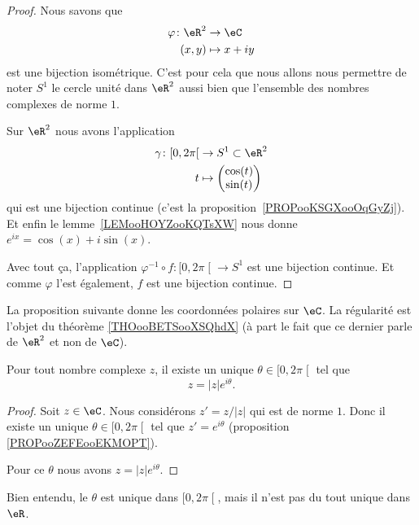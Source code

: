 \begin{proof}
	Nous savons que
	\begin{equation}
		\begin{aligned}
			\varphi\colon \eR^2 & \to \eC      \\
			(x,y)               & \mapsto x+iy
		\end{aligned}
	\end{equation}
	est une bijection isométrique. C'est pour cela que nous allons nous permettre de noter \( S^1\) le cercle unité dans \( \eR^2\) aussi bien que l'ensemble des nombres complexes de norme \( 1\).

	Sur \( \eR^2\) nous avons l'application
	\begin{equation}
		\begin{aligned}
			\gamma\colon \mathopen[ 0 , 2\pi \mathclose[ & \to S^1\subset \eR^2               \\
			t                                            & \mapsto \begin{pmatrix}
				\cos(t) \\
				\sin(t)
			\end{pmatrix}
		\end{aligned}
	\end{equation}
	qui est une bijection continue (c'est la proposition~\ref{PROPooKSGXooOqGyZj}). Et enfin le lemme~\ref{LEMooHOYZooKQTsXW} nous donne \(  e^{ix}=\cos(x)+i\sin(x)\).

	Avec tout ça, l'application \( \varphi^{-1}\circ f\colon \mathopen[ 0 , 2\pi \mathclose[\to S^1 \) est une bijection continue. Et comme \( \varphi\) l'est également, \( f\) est une bijection continue.
\end{proof}

La proposition suivante donne les coordonnées polaires sur \( \eC\). La régularité est l'objet du théorème \ref{THOooBETSooXSQhdX} (à part le fait que ce dernier parle de \( \eR^2\) et non de \( \eC\)).
\begin{proposition}     \label{PROPooRFMKooURhAQJ}
	Pour tout nombre complexe \( z\), il existe un unique \( \theta\in\mathopen[ 0 , 2\pi \mathclose[\) tel que
	\begin{equation}
		z=| z | e^{i\theta}.
	\end{equation}
\end{proposition}

\begin{proof}
	Soit \( z\in \eC\). Nous considérons \( z'=z/| z |\) qui est de norme \( 1\). Donc il existe un unique \( \theta\in\mathopen[ 0 , 2\pi \mathclose[\) tel que \( z'= e^{i\theta}\) (proposition \ref{PROPooZEFEooEKMOPT}).

	Pour ce \( \theta\) nous avons \( z=| z | e^{i\theta}\).
\end{proof}
Bien entendu, le \( \theta\) est unique dans \( \mathopen[ 0 , 2\pi \mathclose[\), mais il n'est pas du tout unique dans \( \eR\).


